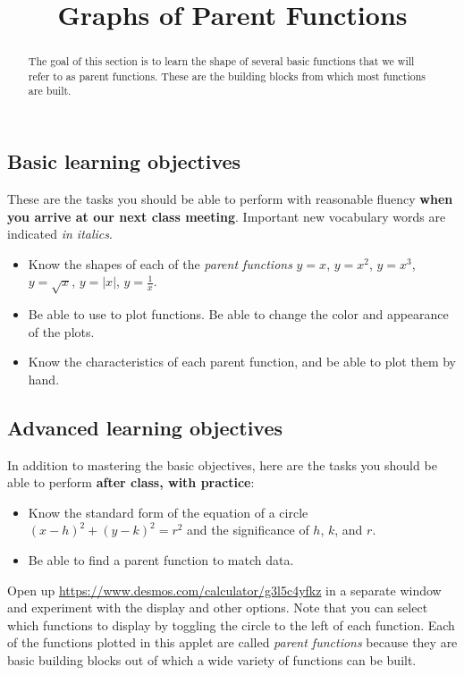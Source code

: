 \documentclass{ximera}
\title{Graphs of Parent Functions}
\begin{document}
\begin{abstract}
The goal of this section is to learn the shape of several basic functions that we will refer to as parent functions. These are the building blocks from which most functions are built.
\end{abstract}
\maketitle

\subsection*{Basic learning objectives}

These are the tasks you should be able to perform with reasonable fluency \textbf{when you arrive at our next class meeting}. Important new vocabulary words are indicated \emph{in italics}. 

\begin{itemize}
	\item Know the shapes of each of the \emph{parent functions} $y=x$, $y=x^2$, $y=x^3$, $y=\sqrt{x}$, $y=|x|$, $y=\frac{1}{x}$.
	\item Be able to use  to plot functions. Be able to change the color and appearance of the plots.
	\item Know the characteristics of each parent function, and be able to plot them by hand.
\end{itemize}

\subsection*{Advanced learning objectives}

In addition to mastering the basic objectives, here are the tasks you should be able to perform \textbf{after class, with practice}: 

\begin{itemize}
	\item Know the standard form of the equation of a circle $(x-h)^2+(y-k)^2=r^2$ and the significance of $h$, $k$, and $r$.
	\item Be able to find a parent function to match data.
\end{itemize}

\noindent\hrulefill

Open up \href{https://www.desmos.com/calculator/g3l5c4yfkz}{https://www.desmos.com/calculator/g3l5c4yfkz} in a separate window and experiment with the display and other options. Note that you can select which functions to display by toggling the circle to the left of each function. Each of the functions plotted in this applet are called \emph{parent functions} because they are basic building blocks out of which a wide variety of functions can be built.
\end{document}
